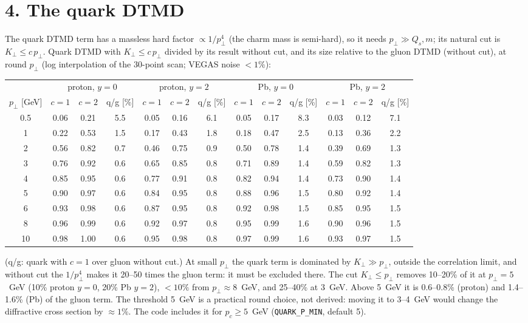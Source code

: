 \documentclass[12pt]{article}
\begin{document}
\section*{4. The quark DTMD}

The quark DTMD term has a massless hard factor $\propto1/p_\perp^4$ (the charm mass is semi-hard), so it
needs $p_\perp\gg Q_s,m$; its natural cut is $K_\perp\leq c\,p_\perp$. Quark DTMD with $K_\perp\leq c\,p_\perp$
divided by its result without cut, and its size relative to the gluon DTMD (without cut), at
round $p_\perp$ (log interpolation of the 30-point scan; VEGAS noise $<1\%$):
\begin{center}
\small
\setlength{\tabcolsep}{4pt}
\begin{tabular}{c|ccc|ccc|ccc|ccc}
\toprule
 & \multicolumn{3}{c|}{proton, $y=0$} & \multicolumn{3}{c|}{proton, $y=2$}
 & \multicolumn{3}{c|}{Pb, $y=0$} & \multicolumn{3}{c}{Pb, $y=2$} \\
$p_\perp$ [GeV] & $c=1$ & $c=2$ & q/g [\%] & $c=1$ & $c=2$ & q/g [\%] & $c=1$ & $c=2$ & q/g [\%] & $c=1$ & $c=2$ & q/g [\%] \\
\midrule
0.5 & 0.06 & 0.21 & 5.5 & 0.05 & 0.16 & 6.1 & 0.05 & 0.17 & 8.3 & 0.03 & 0.12 & 7.1 \\
1   & 0.22 & 0.53 & 1.5 & 0.17 & 0.43 & 1.8 & 0.18 & 0.47 & 2.5 & 0.13 & 0.36 & 2.2 \\
2   & 0.56 & 0.82 & 0.7 & 0.46 & 0.75 & 0.9 & 0.50 & 0.78 & 1.4 & 0.39 & 0.69 & 1.3 \\
3   & 0.76 & 0.92 & 0.6 & 0.65 & 0.85 & 0.8 & 0.71 & 0.89 & 1.4 & 0.59 & 0.82 & 1.3 \\
4   & 0.85 & 0.95 & 0.6 & 0.77 & 0.91 & 0.8 & 0.82 & 0.94 & 1.4 & 0.73 & 0.90 & 1.4 \\
5   & 0.90 & 0.97 & 0.6 & 0.84 & 0.95 & 0.8 & 0.88 & 0.96 & 1.5 & 0.80 & 0.92 & 1.4 \\
6   & 0.93 & 0.98 & 0.6 & 0.87 & 0.95 & 0.8 & 0.92 & 0.98 & 1.5 & 0.85 & 0.95 & 1.5 \\
8   & 0.96 & 0.99 & 0.6 & 0.92 & 0.97 & 0.8 & 0.95 & 0.99 & 1.6 & 0.90 & 0.96 & 1.5 \\
10  & 0.98 & 1.00 & 0.6 & 0.95 & 0.98 & 0.8 & 0.97 & 0.99 & 1.6 & 0.93 & 0.97 & 1.5 \\
\bottomrule
\end{tabular}
\end{center}
(q/g: quark with $c=1$ over gluon without cut.) At small $p_\perp$ the quark term is dominated by
$K_\perp\gg p_\perp$, outside the correlation limit, and without cut the $1/p_\perp^4$ makes it 20--50 times
the gluon term: it must be excluded there. The cut $K_\perp\leq p_\perp$ removes 10--20\% of it at
$p_\perp=5$~GeV (10\% proton $y=0$, 20\% Pb $y=2$), $<10\%$ from $p_\perp\approx8$~GeV, and 25--40\% at
3~GeV. Above 5~GeV it is 0.6--0.8\% (proton) and 1.4--1.6\% (Pb) of the gluon term.
The threshold 5~GeV is a practical round choice, not derived: moving it to 3--4~GeV would change the
diffractive cross section by $\approx1\%$.
The code includes it for $p_c\geq5$~GeV (\texttt{QUARK\_P\_MIN}, default 5).
\end{document}
